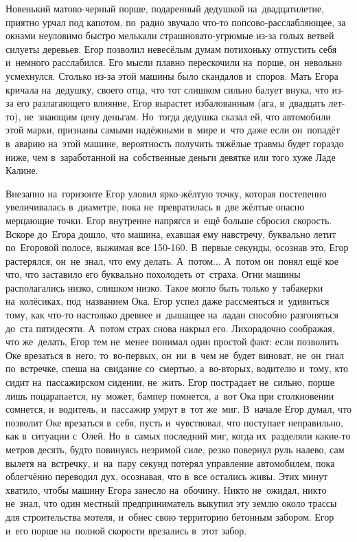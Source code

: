 Новенький матово-черный порше, подаренный дедушкой на~двадцатилетие, приятно урчал под капотом, по~радио звучало что-то попсово-расслабляющее, за окнами неуловимо быстро мелькали страшновато-угрюмые из-за голых ветвей силуеты деревьев.
Егор позволил невесёлым думам потихоньку отпустить себя и~немного расслабился.
Его мысли плавно перескочили на~порше, он~невольно усмехнулся.
Столько из-за этой машины было скандалов и~споров.
Мать Егора кричала на~дедушку, своего отца, что тот слишком сильно балует внука, что из-за его разлагающего влияние, Егор вырастет избалованным (ага, в~двадцать лет-то), не~знающим цену деньгам.
Но~тогда дедушка сказал ей, что автомобили этой марки, признаны самыми надёжными в~мире и~что даже если он~попадёт в~аварию на~этой машине, вероятность получить тяжёлые травмы будет гораздо ниже, чем в~заработанной на~собственные деньги девятке или того хуже Ладе Калине.
 

Внезапно на~горизонте Егор уловил ярко-жёлтую точку, которая постепенно увеличивалась в~диаметре, пока не~превратилась в~две жёлтые опасно мерцающие точки.
Егор внутренне напрягся и~ещё больше сбросил скорость.
Вскоре до~Егора дошло, что машина, ехавшая ему навстречу, буквально летит по~Егоровой полосе, выжимая все 150-160.
В~первые секунды, осознав это, Егор растерялся, он~не~знал, что ему делать.
А~потом... А~потом он~понял ещё кое что, что заставило его буквально похолодеть от~страха.
Огни машины располагались низко, слишком низко.
Такое могло быть только у~табакерки на~колёсиках, под~названием Ока.
Егор успел даже рассмеяться и~удивиться тому, как что-то настолько древнее и~дышащее на~ладан способно разгоняться до~ста пятидесяти.
А~потом страх снова накрыл его.
Лихорадочно соображая, что же~делать, Егор тем не~менее понимал один простой факт: если позволить Оке врезаться в~него, то~во-первых, он~ни~в~чем не~будет виноват, не~он~гнал по~встречке, спеша на~свидание со~смертью, а~во-вторых, водителю и~тому, кто сидит на~пассажирском сидении, не~жить.
Егор пострадает не~сильно, порше лишь поцарапается, ну~может, бампер помнется, а~вот Ока при столкновении сомнется, и~водитель, и~пассажир умрут в~тот же~миг.
В~начале Егор думал, что позволит Оке врезаться в~себя, пусть и~чувствовал, что поступает неправильно, как в~ситуации с~Олей.
Но~в~самых последний миг, когда их~разделяли какие-то метров десять, будто повинуясь незримой силе, резко повернул руль налево, сам вылетя на~встречку, и~на~пару секунд потерял управление автомобилем, пока облегчённо переводил дух, осознавая, что в~все остались живы.
Этих минут хватило, чтобы машину Егора занесло на~обочину.
Никто не~ожидал, никто не~знал, что один местный предприниматель выкупил эту землю около трассы для строительства мотеля, и~обнес свою территорию бетонным забором.
Егор и~его порше на~полной скорости врезались в~этот забор.
 
